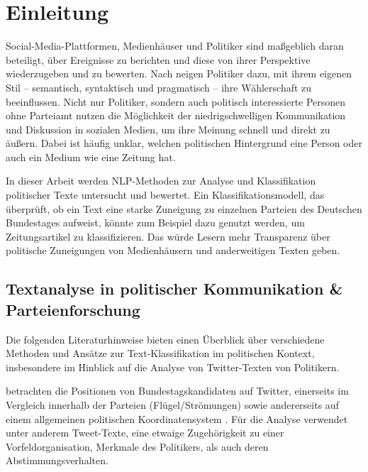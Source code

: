 
\chapter{Einleitung} \label{ch:introduction}

Social-Media-Plattformen, Medienhäuser und Politiker sind maßgeblich daran beteiligt, über Ereignisse zu berichten und diese von ihrer Perspektive wiederzugeben und zu bewerten. Nach \textcite{willeke_soziale_2019} neigen Politiker dazu, mit ihrem eigenen Stil -- semantisch, syntaktisch und pragmatisch -- ihre Wählerschaft zu beeinflussen. Nicht nur Politiker, sondern auch politisch interessierte Personen ohne Parteiamt nutzen die Möglichkeit der niedrigschwelligen Kommunikation und Diskussion in sozialen Medien, um ihre Meinung schnell und direkt zu äußern. Dabei ist häufig unklar, welchen politischen Hintergrund eine Person oder auch ein Medium wie eine Zeitung hat.

In dieser Arbeit werden \ac{NLP}-Methoden zur Analyse und Klassifikation politischer Texte untersucht und bewertet. Ein Klassifikationsmodell, das überprüft, ob ein Text eine starke Zuneigung zu einzelnen Parteien des Deutschen Bundestages aufweist, könnte zum Beispiel dazu genutzt werden, um Zeitungsartikel zu klassifizieren. Das würde Lesern mehr Transparenz über politische Zuneigungen von Medienhäusern und anderweitigen Texten geben.

\section{Textanalyse in politischer Kommunikation \& Parteienforschung} \label{sec:introductionTextanalysis}

Die folgenden Literaturhinweise bieten einen Überblick über verschiedene Methoden und Ansätze zur Text-Klassifikation im politischen Kontext, insbesondere im Hinblick auf die Analyse von Twitter-Texten von Politikern.

\textcite{saltzer_bundestagswahl_2022} betrachten die Positionen von Bundestagskandidaten auf Twitter, einerseits im Vergleich innerhalb der Parteien (Flügel/Strömungen) sowie andererseits auf einem allgemeinen politischen Koordinatensystem \autocite{saltzer_bundestagswahl_2022, saltzer_finding_2022}. Für die Analyse verwendet \textcite{saltzer_finding_2022} unter anderem Tweet-Texte, eine etwaige Zugehörigkeit zu einer Vorfeldorganisation, Merkmale des Politikers, als auch deren Abstimmungsverhalten.

